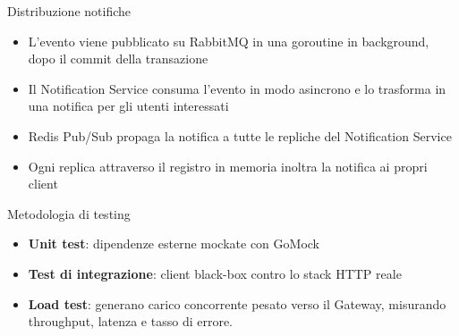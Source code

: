 \documentclass[10pt]{beamer}
\begin{document}
\begin{frame}{Distribuzione notifiche}
\centering
	\begin{itemize}
   	\item L'evento viene pubblicato su RabbitMQ in una goroutine in background, dopo il commit della transazione
    \item Il Notification Service consuma l'evento in modo asincrono e lo trasforma in una notifica per gli utenti interessati
    \item Redis Pub/Sub propaga la notifica a tutte le repliche del Notification Service
   		\item Ogni replica attraverso il registro in memoria inoltra la notifica ai propri client
     \end{itemize}
 \vspace{0.3cm}
\centering
{}
\end{frame}

\begin{frame}{Metodologia di testing}
\begin{itemize}
    \item \textbf{Unit test}: dipendenze esterne mockate con GoMock
    \item \textbf{Test di integrazione}: client black-box contro lo stack HTTP reale
    \item \textbf{Load test}: generano carico concorrente pesato verso il Gateway, misurando throughput, latenza e tasso di errore.
\end{itemize}
\end{frame}
\end{document}
